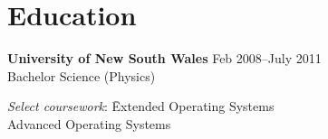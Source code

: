 

\vspace{-0.6cm}
\section*{Education}
\vspace{-0.2cm}

\textbf{University of New South Wales}\tabto{9.5cm} Feb 2008--July 2011\\
Bachelor Science (Physics)
\vspace{-0.3cm}
\begin{tabbing}
\textit{Select coursework}: \=Extended Operating Systems \\
                            \>Advanced Operating Systems
\end{tabbing}

